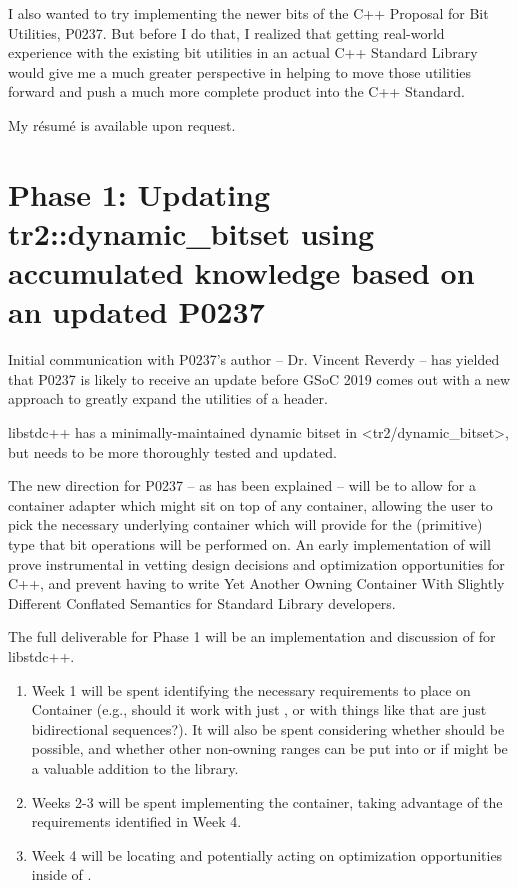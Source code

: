 \documentclass{wg21}
\begin{document}
I also wanted to try implementing the newer bits of the C++ Proposal for Bit Utilities, P0237\cite{p0237}. But before I do that, I realized that getting real-world experience with the existing bit utilities in an actual C++ Standard Library would give me a much greater perspective in helping to move those utilities forward and push a much more complete product into the C++ Standard.

My résumé is available upon request.


\section[phase1]{Phase 1: Updating tr2::dynamic_bitset using accumulated knowledge based on an updated P0237}

Initial communication with P0237's author -- Dr. Vincent Reverdy -- has yielded that P0237 is likely to receive an update before GSoC 2019 comes out with a new approach to greatly expand the utilities of a  header.

libstdc++ has a minimally-maintained dynamic bitset in <tr2/dynamic_bitset>, but needs to be more thoroughly tested and updated.

The new direction for P0237 -- as has been explained -- will be to allow for a container adapter which might sit on top of any container, allowing the user to pick the necessary underlying container which will provide for the (primitive) type that bit operations will be performed on. An early implementation of  will prove instrumental in vetting design decisions and optimization opportunities for C++, and prevent having to write Yet Another Owning Container With Slightly Different Conflated Semantics for Standard Library developers.

The full deliverable for Phase 1 will be an implementation and discussion of  for libstdc++.

\begin{enumerate}
	\item Week 1 will be spent identifying the necessary requirements to place on Container (e.g., should it work with just , or with things like  that are just bidirectional sequences?). It will also be spent considering whether  should be possible, and whether other non-owning ranges can be put into  or if  might be a valuable addition to the library.
	\item Weeks 2-3 will be spent implementing the container, taking advantage of the requirements identified in Week 4.
	\item Week 4 will be locating and potentially acting on optimization opportunities inside of .
\end{enumerate}
\end{document}
